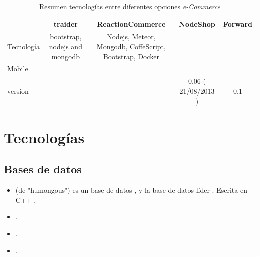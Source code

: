 \begin{table}[h!]
    \tiny
   
\begin{tabular}{ |l|c|c|c|c| }
\hline
	&
	traider\cite{online_Traider}&
	ReactionCommerce\cite{online_reactionCommerce}&
	NodeShop\cite{online_NodeShop}&
	Forward\cite{online_Forward}
 
\\ \hline
	Tecnología &
	bootstrap, nodejs and mongodb &
	Nodejs, Meteor, Mongodb, CoffeScript, Bootstrap, Docker&
	&
	

\\ \hline
	Mobile &
	&
	&
	&
\\ \hline
	version &
	&
	&
	0.06 ( 21/08/2013 )&
	0.1

\\ \hline
\end{tabular}
    \caption{ Resumen tecnologías entre diferentes opciones \textit{e-Commerce}}
    \label{tab:resume_technology_ecommerce}
\end{table}

\section{Tecnologías }\label{cap:estadoArte:tecnologias}

\subsection{Bases de datos}
\begin{itemize}
	\item \textbf{\mongodb} (de "humongous") es un base de datos \documentoriented \opensource, y la base de datos líder \nosql. Escrita en C++ \cite{technology_mongodb}.
	
	\item \textbf{\mysql}.
	
	\item \textbf{\postgresql}.
	
	\item \textbf{\sqlite}.
\end{itemize}

